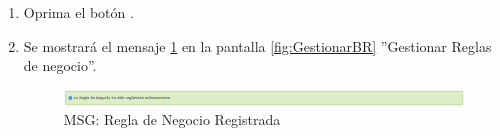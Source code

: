 \begin{enumerate}
			\item Oprima el botón \IUAceptar.
			
			\item Se mostrará el mensaje \ref{fig:BRRegistrada} en la pantalla \ref{fig:GestionarBR} ''Gestionar Reglas de negocio''.
			
			\begin{figure}[htbp!]
				\begin{center}
					\includegraphics[scale=0.5]{roles/lider/reglasNegocio/pantallas/IU8-1MSG1}
					\caption{MSG: Regla de Negocio Registrada}
					\label{fig:BRRegistrada}
				\end{center}
			\end{figure}
			\end{enumerate}